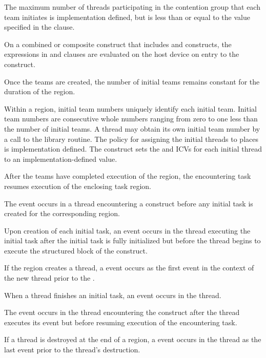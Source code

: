 The maximum number of threads participating in the contention group that each team
initiates is implementation defined, but is less than or equal to the value specified in the
 clause.

On a combined or composite construct that includes  and
 constructs, the expressions in  and
 clauses are evaluated on the host device on
entry to the  construct.

Once the teams are created, the number of initial teams remains constant for the duration of the
 region.

Within a  region, initial team numbers uniquely identify each
initial team. Initial team numbers are
consecutive whole numbers ranging from zero to one less than the number of
initial teams. A
thread may obtain its own initial team number by a call to the  library
routine.
The policy for assigning the initial threads to places is implementation defined.
The  construct sets the  and  ICVs for each initial thread to an implementation-defined value.

After the teams have completed execution of the  region, the encountering task
resumes execution of the enclosing task region.

\events

The  event occurs in a thread encountering a
 construct before any initial task is created for the
corresponding  region.

Upon creation of each initial task, an  event
occurs in the thread executing the initial task after the initial
task is fully initialized but before the thread begins to execute the
structured block of the  construct.

If the  region creates a thread, a 
event occurs as the first event in the context of the new thread
prior to the .

When a thread finishes an initial task, an 
event occurs in the thread.

The  event occurs in the thread encountering the
 construct after the thread
executes its  event
but before resuming execution of the encountering task.

If a thread is destroyed at the end of a  region, a
 event occurs in the thread as the last
event prior to the thread's destruction.

